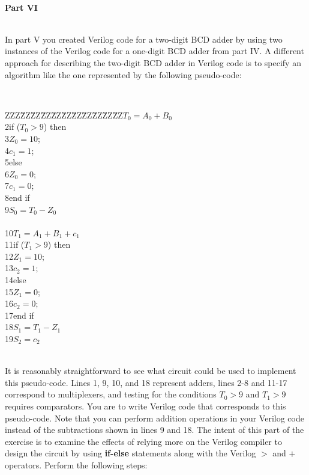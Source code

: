 \documentclass[psfig,10pt,fullpage]{article}
\begin{document}
~\\
\noindent
{\bf Part VI}

~\\
In part V you created Verilog code for a two-digit BCD adder by using two instances of the
Verilog code for a one-digit BCD adder from part IV. A different approach for describing
the two-digit BCD adder in Verilog code is to specify an algorithm like the one
represented by the following pseudo-code:

~\\
\begin{center}
\begin{minipage}[t]{12.5 cm}
\begin{tabbing}
ZZZ\=ZZ\=ZZ\=ZZ\=ZZ\=ZZ\=ZZ\=ZZ\=ZZ\=ZZ\=ZZ\>$T_0 = A_0 + B_0$ \\
2\>if ($T_0 > 9$) then\\
3\>\>$Z_0 = 10$;\\
4\>\>$c_1 = 1$;\\
5\>else\\
6\>\>$Z_0 = 0$;\\
7\>\>$c_1 = 0$;\\
8\>end if\\
9\>$S_0 = T_0 - Z_0$\\
~\\
10\>$T_1 = A_1 + B_1 + c_1$ \\
11\>if ($T_1 > 9$) then\\
12\>\>$Z_1 = 10$;\\
13\>\>$c_2 = 1$;\\
14\>else\\
15\>\>$Z_1 = 0$;\\
16\>\>$c_2 = 0$;\\
17\>end if\\
18\>$S_1 = T_1 - Z_1$\\
19\>$S_2 = c_2$\\
\end{tabbing}
\end{minipage}
\end{center}
~\\
It is reasonably straightforward to see what circuit could be used to implement this
pseudo-code. Lines 1, 9, 10, and 18 represent adders, lines 2-8 and 11-17 correspond to
multiplexers, and testing for the conditions $T_0 > 9$ and $T_1 > 9$ requires comparators.
You are to write Verilog code that corresponds to this pseudo-code. Note that you can
perform addition operations in your Verilog code instead of the subtractions shown 
in lines 9 and 18. The intent of this part of the exercise is
to examine the effects of relying more on the Verilog compiler to design the circuit by using
{\bf if-else} statements along with the Verilog $>$ and $+$ operators. 
Perform the following steps:
\end{document}
